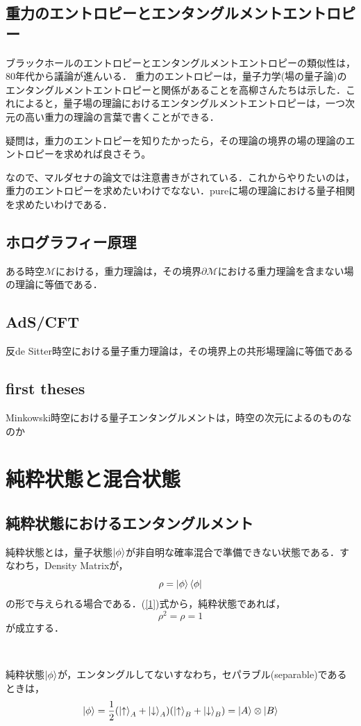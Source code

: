 \subsection{重力のエントロピーとエンタングルメントエントロピー}
ブラックホールのエントロピーとエンタングルメントエントロピーの類似性は，80年代から議論が進んいる．
重力のエントロピーは，量子力学(場の量子論)のエンタングルメントエントロピーと関係があることを高柳さんたちは示した．これによると，量子場の理論におけるエンタングルメントエントロピーは，一つ次元の高い重力の理論の言葉で書くことができる．


疑問は，重力のエントロピーを知りたかったら，その理論の境界の場の理論のエントロピーを求めれば良さそう。

なので、マルダセナの論文では注意書きがされている．これからやりたいのは，重力のエントロピーを求めたいわけでなない．pureに場の理論における量子相関を求めたいわけである．


\subsection{ホログラフィー原理}
ある時空$\mathcal{M}$における，重力理論は，その境界$\mathcal{\partial M}$における重力理論を含まない場の理論に等価である．
\subsection{AdS/CFT}
反de Sitter時空における量子重力理論は，その境界上の共形場理論に等価である
\subsection{first theses}
Minkowski時空における量子エンタングルメントは，時空の次元によるのものなのか
\section{純粋状態と混合状態}
\subsection{純粋状態におけるエンタングルメント}
純粋状態とは，量子状態$\ket{\phi}$が非自明な確率混合で準備できない状態である．すなわち，Density Matrixが，
\begin{equation}
\label{1}
\rho=\ket{\phi}\bra{\phi}
\end{equation}
の形で与えられる場合である．(\ref{1})式から，純粋状態であれば，
\begin{equation}
\rho^{2}=\rho=1
\end{equation}
が成立する．
\begin{empheqboxed}
  \
  \

  純粋状態$\ket{\phi}$が，エンタングルしてないすなわち，セパラブル(separable)であるときは，
  \begin{equation}
    \label{3}
  \ket{\phi}=\frac{1}{2}(\ket{\uparrow}_{A}+\ket{\downarrow}_{A})(\ket{\uparrow}_{B} +\ket{\downarrow}_{B})=\ket{A}\otimes\ket{B}
  \end{equation}

\end{empheqboxed}

